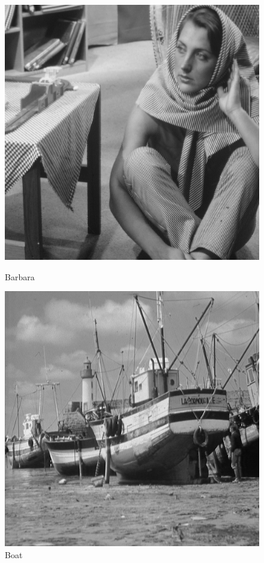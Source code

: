 \documentclass{article}
\begin{document}
    \begin{figure}[!htb]
      \includegraphics[scale=.35]{../images/barbara.png}
      \caption{Barbara}
    \endminipage \hfill
      \includegraphics[scale=1.55]{../images/boat.png}
      \caption{Boat}
    \endminipage
    \end{figure}
    
\end{document}

